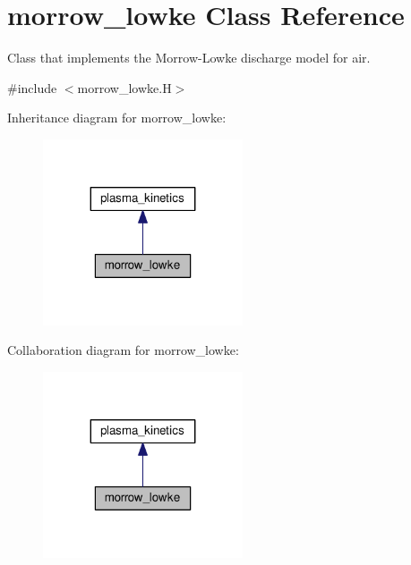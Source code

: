 \hypertarget{classmorrow__lowke}{}\section{morrow\+\_\+lowke Class Reference}
\label{classmorrow__lowke}


Class that implements the Morrow-\/\+Lowke discharge model for air.  




{\ttfamily \#include $<$morrow\+\_\+lowke.\+H$>$}



Inheritance diagram for morrow\+\_\+lowke\+:\nopagebreak
\begin{figure}[H]
\begin{center}
\leavevmode
\includegraphics[width=167pt]{classmorrow__lowke__inherit__graph}
\end{center}
\end{figure}


Collaboration diagram for morrow\+\_\+lowke\+:\nopagebreak
\begin{figure}[H]
\begin{center}
\leavevmode
\includegraphics[width=167pt]{classmorrow__lowke__coll__graph}
\end{center}
\end{figure}
